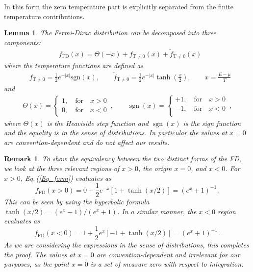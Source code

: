 \documentclass[sn-mathphys,Numbered]{sn-jnl}
\newcommand{\req}[1]{Eq.\,(\ref{#1})}
\DeclareMathOperator{\sgn}{sgn}
\newtheorem{lemma}[theorem]{Lemma}
\newtheorem{remark}{Remark}
\begin{document}
In this form the zero temperature part is explicitly separated from the finite temperature contributions. 
\begin{lemma}
 The Fermi-Dirac distribution can be decomposed into three components:
\begin{align}\label{Eq_form}
&f_\mathrm{FD}(x)=\Theta(-x)+f_\mathrm{T\neq0}(x)+\widetilde f_\mathrm{T\neq0}(x)
\end{align}
where the temperature functions are defined as
\begin{align}\label{eq:f_T_nonzero_def}
&f_\mathrm{T\neq0}=\frac{1}{2}e^{ -|x| }\mathrm{sgn}\left(x\right),\qquad
\widetilde f_\mathrm{T\neq0}=\frac{1}{2}e^{ - |x| }\tanh\left(\frac{x}{2}\right),\qquad x=\frac{E-\mu}{T}
\end{align}
and
\begin{align}
\label{NFF2}
\Theta(x)=\left\{
\begin{array}{r}
1,\quad\mathrm{for}\quad{x}>0\\
0,\quad\mathrm{for}\quad{x}<0
\end{array}\right.\,,\qquad
\sgn(x)=\left\{
\begin{array}{r}
+1,\quad\mathrm{for}\quad{x}>0\\
-1,\quad\mathrm{for}\quad{x}<0\\
\end{array}\right.\,,
\end{align}
where $\Theta(x)$ is the Heaviside step function and $\sgn(x)$ is the sign function and the equality is in the sense of distributions. In particular the values at $x=0$ are convention-dependent and do not affect our results. 
\end{lemma}

\begin{remark}\label{remark:TFdist}
To show the equivalency between the two distinct forms of the FD, we look at the three relevant regions of $x>0$, the origin $x=0$, and $x<0$. For $x>0$, \req{Eq_form} evaluates as
\begin{equation}\label{eq:xpos}
 f_\mathrm{FD}(x>0) = 0 + \frac{1}{2}e^{-x}[1+\tanh(x/2)] = (e^x + 1)^{-1}\,.
 \end{equation}
 This can be seen by using the hyperbolic formula $\tanh(x/2)=(e^x-1)/(e^x+1)$. In a similar manner, the $x<0$ region evaluates as
 \begin{equation}\label{eq:xneg}
 f_\mathrm{FD}(x<0) = 1 + \frac{1}{2}e^{x}[-1 + \tanh(x/2)] = (e^x + 1)^{-1}\,.
 \end{equation}
 As we are considering the expressions in the sense of distributions, this completes the proof. The values at $x=0$ are convention-dependent and irrelevant for our purposes, as the point $x=0$ is a set of measure zero with respect to integration.
\end{remark} 
\end{document}

